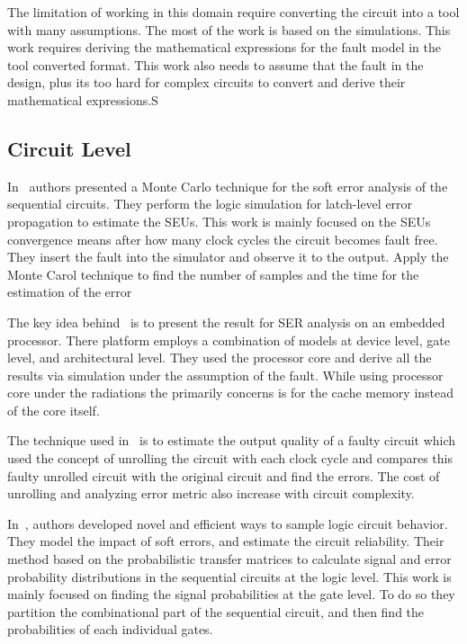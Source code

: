 The limitation of working in this domain require converting the circuit into a tool with many assumptions. The most of the work is based on the simulations. This work requires deriving the mathematical expressions for the fault model in the tool converted format. This work also needs to assume that the fault in the design, plus its too hard for complex circuits to convert and derive their mathematical expressions.S


\subsection{Circuit Level}


In~\citep{li2016monte} authors presented a  Monte Carlo technique for the soft error analysis of the sequential
circuits. They perform the logic simulation for latch-level error propagation to estimate the SEUs. This work is mainly focused on the SEUs convergence means after how many clock cycles the circuit becomes fault free.
They insert the fault into the simulator and observe it to the output. Apply the Monte Carol technique
to find the number of samples and the time for the estimation of the error
  
  

The key idea behind~\citep{ebrahimi2015comprehensive} is to present the result for SER analysis on an embedded
processor. There platform employs a combination of models at device level, gate level, and architectural level. They used the
processor core and derive all the results via simulation under the assumption of the fault. While using processor core under the radiations the primarily concerns is for the cache memory instead
of the core itself.


The technique  used in~\citep{ranjan2014aslan} is to estimate the output quality of a faulty circuit which used the concept
of unrolling the circuit with each clock cycle and compares this faulty unrolled circuit with the original circuit and find the errors.
The cost of unrolling and analyzing error metric also increase
with circuit complexity.

In~\citep{yu2010scalable}, authors developed novel and efficient ways to sample logic circuit behavior. They 
model the impact of soft errors, and estimate the circuit reliability. Their method based on the probabilistic transfer matrices to calculate signal and error probability distributions in the
sequential circuits at the logic level. This work is mainly focused on finding the signal probabilities at the gate level. To do so
they partition the combinational part of the sequential circuit, and then find the probabilities of each
individual gates.


